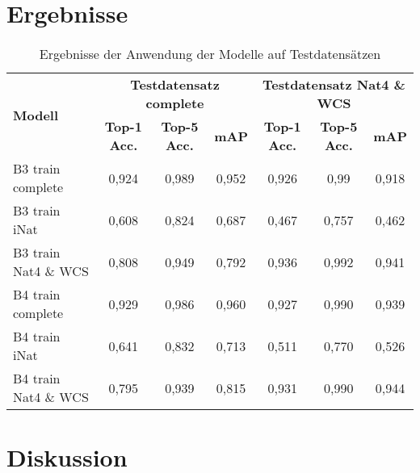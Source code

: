 \section{Ergebnisse}
\begin{table}[!h]
	\centering
	\caption{Ergebnisse der Anwendung der Modelle auf Testdatensätzen}
	\begin{tabular}{l|ccc|ccc}
		\multirow{2}{*}{\textbf{Modell}} & \multicolumn{3}{c|}{\textbf{Testdatensatz complete}}               & \multicolumn{3}{c}{\textbf{Testdatensatz Nat4 \& WCS}}            \\
		& \textbf{Top-1 Acc.} & \textbf{Top-5 Acc.} & \textbf{mAP} & \textbf{Top-1 Acc.} & \textbf{Top-5 Acc.} & \textbf{mAP} \\
		\hline
		B3 train complete                & 0,924               & 0,989               & 0,952        & 0,926               & 0,99                & 0,918        \\
		B3 train iNat                    & 0,608               & 0,824               & 0,687        & 0,467               & 0,757               & 0,462        \\
		B3 train Nat4 \& WCS             & 0,808               & 0,949               & 0,792        & 0,936               & 0,992               & 0,941        \\
		\hline
		B4 train complete                & 0,929               & 0,986               & 0,960         & 0,927               & 0,990                & 0,939        \\
		B4 train iNat                    & 0,641               & 0,832               & 0,713        & 0,511               & 0,770                & 0,526        \\
		B4 train Nat4 \& WCS             & 0,795               & 0,939               & 0,815        & 0,931               & 0,990                & 0,944       
	\end{tabular}
\end{table}
\section{Diskussion}
